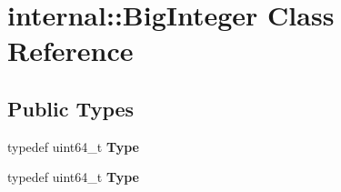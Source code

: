 \hypertarget{classinternal_1_1_big_integer}{}\section{internal\+:\+:Big\+Integer Class Reference}
\label{classinternal_1_1_big_integer}
\subsection*{Public Types}
\begin{DoxyCompactItemize}
\item 
typedef uint64\+\_\+t {\bfseries Type}\hypertarget{classinternal_1_1_big_integer_a1310812fca26ebae77594ba08678fc4c}{}\label{classinternal_1_1_big_integer_a1310812fca26ebae77594ba08678fc4c}

\item 
typedef uint64\+\_\+t {\bfseries Type}\hypertarget{classinternal_1_1_big_integer_a1310812fca26ebae77594ba08678fc4c}{}\label{classinternal_1_1_big_integer_a1310812fca26ebae77594ba08678fc4c}

\end{DoxyCompactItemize}
